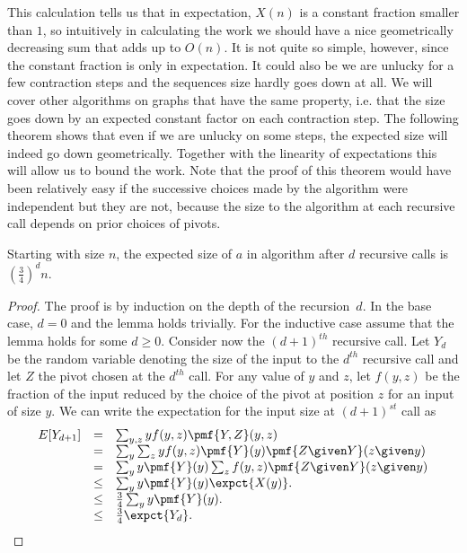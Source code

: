 {%

This calculation tells us that in expectation, $X(n)$ is a constant
fraction smaller than $1$, so intuitively in calculating the work we
should have a nice geometrically decreasing sum that adds up to
$O(n)$.  
%
It is not quite so simple, however, since the constant
fraction is only in expectation.
%
It could also be we are unlucky for a few
contraction steps and the sequences size hardly goes down at all.  
%
We will cover other algorithms on graphs that have the same property,
i.e. that the size goes down by an expected constant factor on each
contraction step.  
%
The following theorem shows that even if we are unlucky on some steps,
the expected size will indeed go down geometrically.  Together with
the linearity of expectations this will allow us to bound the work.
%
Note that the proof of this theorem would have been relatively easy if
the successive choices made by the algorithm were independent but they
are not, because the size to the algorithm at each recursive call
depends on prior choices of pivots.
%

\begin{theorem}
\label{thm:random::contract}
Starting with size $n$, the expected size of $a$ in algorithm
\ksmall{} after
$d$ recursive calls is $\left(\frac{3}{4}\right)^d n$.  
\end{theorem}

\begin{proof}
The proof is by induction on the depth of the recursion~$d$. 
%
In the base case, $d = 0$ and the lemma holds trivially.
%
For the inductive case assume that the lemma holds for some $d  \ge 0$.
%
Consider now the $(d+1)^{th}$ recursive call.
%
Let $Y_d$ be the random variable denoting the size of the input to the
$d^{th}$ recursive call and let $Z$ the pivot chosen at the
$d^{th}$ call.
%
For any value of $y$ and $z$, let $f(y,z)$ be the fraction of the
input reduced by the choice of the pivot at position $z$ for an input of size
$y$. 
%
We can write the expectation for the input size at $(d+1)^{st}$ call
as 
\[
\begin{array}{lll}
E[Y_{d+1}] 
& = & \sum_{y,z}{y f(y,z) \pmf{Y,Z}(y,z)} 
\\
& = & \sum_{y}{\sum_{z}{y f(y,z) \pmf{Y}(y) \pmf{Z \given Y}(z \given y)}} 
\\
& = & \sum_{y}{y \pmf{Y}(y) \sum_{z}{f(y,z) \pmf{Z \given Y}(z \given y)}} 
\\
& \le & \sum_{y}{y \pmf{Y}(y) \expct{X(y)}}.
\\
& \le & \frac34 \sum_{y}{y \pmf{Y}(y)}.
\\
&\le & \frac34 \expct{Y_d}.
\end{array}
\]  


\end{proof}}
